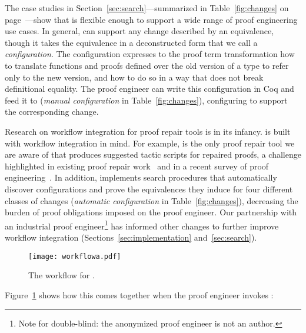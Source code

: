 The case studies in Section~\ref{sec:search}---summarized in Table~\ref{fig:changes} on page~\pageref{fig:changes}---show that \toolname is flexible enough to support
a wide range of proof engineering use cases. %
In general, \toolname can support any change described by an equivalence, though it takes the equivalence in a
deconstructed form that we call a \textit{configuration}.
The configuration expresses to the proof term transformation how to translate functions and proofs defined over the old version of a type
to refer only to the new version, and how to do so in a way that does not break definitional equality.
The proof engineer can write this configuration in Coq and feed it to \toolname (\textit{manual configuration} in Table~\ref{fig:changes}),
configuring \toolname to support the corresponding change. %

Research on workflow integration for proof repair tools is in its infancy.
\toolname is built with workflow integration in mind.
For example, \toolname is the only proof repair tool we are aware of that produces suggested tactic scripts for repaired proofs,
a challenge highlighted in existing proof repair work~\cite{pumpkinpatch, robert2018} and in 
a recent survey of proof engineering~\cite{PGL-045}.
In addition, \toolname implements search procedures that 
automatically discover configurations and prove the equivalences they induce for four different classes of 
changes (\textit{automatic configuration} in Table~\ref{fig:changes}),
decreasing the burden of proof obligations imposed on the proof engineer.
Our partnership with an industrial proof engineer\footnote{Note for double-blind: the anonymized proof engineer is not an author.} has informed other changes to further improve workflow integration
(Sections~\ref{sec:implementation} and~\ref{sec:search}).

\begin{figure}
\texttt{[image: workflowa.pdf]}
\vspace{-0.7cm}
\caption{The workflow for \toolname.}
\vspace{-0.1cm}
\label{fig:system}
\end{figure}

Figure~\ref{fig:system} shows how this comes together when the proof engineer invokes \toolname:

